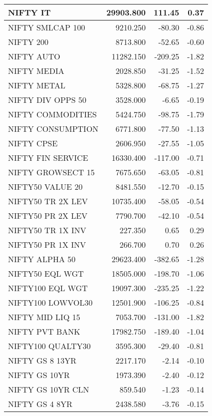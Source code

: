 \documentclass[
]{article}
\begin{document}
\begin{table}
\begin{tabular}{l|r|r|r}
\hline
NIFTY IT & 29903.800 & 111.45 & 0.37\\
\hline
NIFTY SMLCAP 100 & 9210.250 & -80.30 & -0.86\\
\hline
NIFTY 200 & 8713.800 & -52.65 & -0.60\\
\hline
NIFTY AUTO & 11282.150 & -209.25 & -1.82\\
\hline
NIFTY MEDIA & 2028.850 & -31.25 & -1.52\\
\hline
NIFTY METAL & 5328.800 & -68.75 & -1.27\\
\hline
NIFTY DIV OPPS 50 & 3528.000 & -6.65 & -0.19\\
\hline
NIFTY COMMODITIES & 5424.750 & -98.75 & -1.79\\
\hline
NIFTY CONSUMPTION & 6771.800 & -77.50 & -1.13\\
\hline
NIFTY CPSE & 2606.950 & -27.55 & -1.05\\
\hline
NIFTY FIN SERVICE & 16330.400 & -117.00 & -0.71\\
\hline
NIFTY GROWSECT 15 & 7675.650 & -63.05 & -0.81\\
\hline
NIFTY50 VALUE 20 & 8481.550 & -12.70 & -0.15\\
\hline
NIFTY50 TR 2X LEV & 10735.400 & -58.05 & -0.54\\
\hline
NIFTY50 PR 2X LEV & 7790.700 & -42.10 & -0.54\\
\hline
NIFTY50 TR 1X INV & 227.350 & 0.65 & 0.29\\
\hline
NIFTY50 PR 1X INV & 266.700 & 0.70 & 0.26\\
\hline
NIFTY ALPHA 50 & 29623.400 & -382.65 & -1.28\\
\hline
NIFTY50 EQL WGT & 18505.000 & -198.70 & -1.06\\
\hline
NIFTY100 EQL WGT & 19097.300 & -235.25 & -1.22\\
\hline
NIFTY100 LOWVOL30 & 12501.900 & -106.25 & -0.84\\
\hline
NIFTY MID LIQ 15 & 7053.700 & -131.00 & -1.82\\
\hline
NIFTY PVT BANK & 17982.750 & -189.40 & -1.04\\
\hline
NIFTY100 QUALTY30 & 3595.300 & -29.40 & -0.81\\
\hline
NIFTY GS 8 13YR & 2217.170 & -2.14 & -0.10\\
\hline
NIFTY GS 10YR & 1973.390 & -2.40 & -0.12\\
\hline
NIFTY GS 10YR CLN & 859.540 & -1.23 & -0.14\\
\hline
NIFTY GS 4 8YR & 2438.580 & -3.76 & -0.15\\
\hline

\end{tabular}
\end{table}
\end{document}
